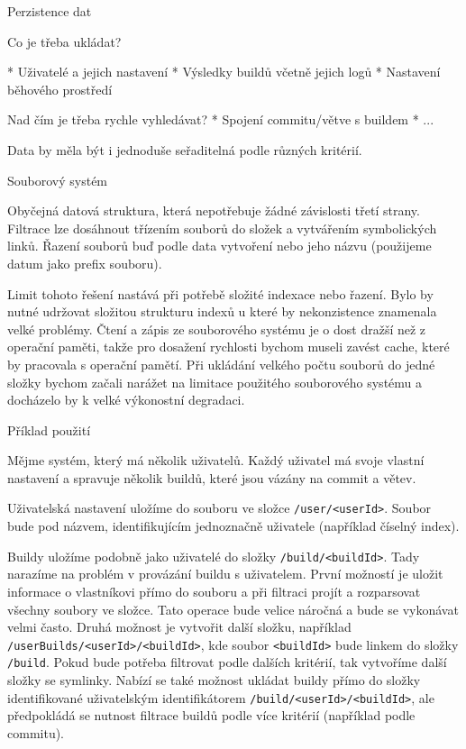 \sec Perzistence dat

Co je třeba ukládat?

\begitems
* Uživatelé a jejich nastavení
* Výsledky buildů včetně jejich logů
* Nastavení běhového prostředí
\enditems

\noindent Nad čím je třeba rychle vyhledávat?
\begitems
* Spojení commitu/větve s buildem
* ...
\enditems

\noindent
Data by měla být i jednoduše seřaditelná podle různých kritérií.

\secc Souborový systém

Obyčejná datová struktura, která nepotřebuje žádné závislosti třetí strany.
Filtrace lze dosáhnout třízením souborů do složek a vytvářením symbolických linků.
Řazení souborů buď podle data vytvoření nebo jeho názvu (použijeme datum jako prefix souboru).

Limit tohoto řešení nastává při potřebě složité indexace nebo řazení.
Bylo by nutné udržovat složitou strukturu indexů u které by nekonzistence znamenala velké problémy.
Čtení a zápis ze souborového systému je o dost dražší než z operační paměti, takže pro dosažení rychlosti bychom museli zavést cache, které by pracovala s operační pamětí.
Při ukládání velkého počtu souborů do jedné složky bychom začali narážet na limitace použitého souborového systému a docházelo by k velké výkonostní degradaci.

\seccc Příklad použití

Mějme systém, který má několik uživatelů.
Každý uživatel má svoje vlastní nastavení a spravuje několik buildů, které jsou vázány na commit a větev.

Uživatelská nastavení uložíme do souboru ve složce {\tt /user/<userId>}. Soubor bude pod názvem, identifikujícím jednoznačně uživatele (například číselný index). 

Buildy uložíme podobně jako uživatelé do složky {\tt /build/<buildId>}.
Tady narazíme na problém v provázání buildu s uživatelem.
První možností je uložit informace o vlastníkovi přímo do souboru a při filtraci projít a rozparsovat všechny soubory ve složce.
Tato operace bude velice náročná a bude se vykonávat velmi často.
Druhá možnost je vytvořit další složku, například {\tt /userBuilds/<userId>/<buildId>}, kde soubor {\tt <buildId>} bude linkem do složky {\tt /build}.
Pokud bude potřeba filtrovat podle dalších kritérií, tak vytvoříme další složky se symlinky.
Nabízí se také možnost ukládat buildy přímo do složky identifikované uživatelským identifikátorem {\tt /build/<userId>/<buildId>}, ale předpokládá se nutnost filtrace buildů podle více kritérií (například podle commitu).

